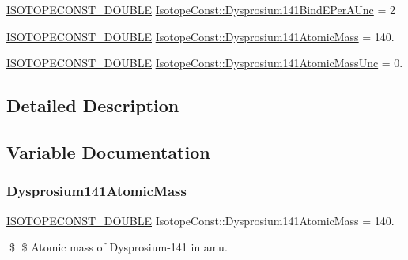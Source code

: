 \begin{DoxyCompactItemize}
\mbox{\hyperlink{group___isotope_const-_macros_ga8f45a7272ce02c0b4c65c44636ed719a}{I\+S\+O\+T\+O\+P\+E\+C\+O\+N\+S\+T\+\_\+\+D\+O\+U\+B\+LE}} \mbox{\hyperlink{group___isotope_const-_dysprosium-_dy141_ga3e916cec9de10a0375128122ea08b862}{Isotope\+Const\+::\+Dysprosium141\+Bind\+E\+Per\+A\+Unc}} = 2
\item 
\mbox{\hyperlink{group___isotope_const-_macros_ga8f45a7272ce02c0b4c65c44636ed719a}{I\+S\+O\+T\+O\+P\+E\+C\+O\+N\+S\+T\+\_\+\+D\+O\+U\+B\+LE}} \mbox{\hyperlink{group___isotope_const-_dysprosium-_dy141_ga73448dca5d056c5194c6903e36caaa44}{Isotope\+Const\+::\+Dysprosium141\+Atomic\+Mass}} = 140.
\item 
\mbox{\hyperlink{group___isotope_const-_macros_ga8f45a7272ce02c0b4c65c44636ed719a}{I\+S\+O\+T\+O\+P\+E\+C\+O\+N\+S\+T\+\_\+\+D\+O\+U\+B\+LE}} \mbox{\hyperlink{group___isotope_const-_dysprosium-_dy141_gade30619dfda139bc3a70a01aa62e1ad4}{Isotope\+Const\+::\+Dysprosium141\+Atomic\+Mass\+Unc}} = 0.
\end{DoxyCompactItemize}


\subsection{Detailed Description}


\subsection{Variable Documentation}
\mbox{\label{group___isotope_const-_dysprosium-_dy141_ga73448dca5d056c5194c6903e36caaa44}} 
\subsubsection{\texorpdfstring{Dysprosium141\+Atomic\+Mass}{Dysprosium141AtomicMass}}
{\footnotesize\ttfamily \mbox{\hyperlink{group___isotope_const-_macros_ga8f45a7272ce02c0b4c65c44636ed719a}{I\+S\+O\+T\+O\+P\+E\+C\+O\+N\+S\+T\+\_\+\+D\+O\+U\+B\+LE}} Isotope\+Const\+::\+Dysprosium141\+Atomic\+Mass = 140.}

\$ \$ Atomic mass of Dysprosium-\/141 in amu. \mbox{\label{group___isotope_const-_dysprosium-_dy141_gade30619dfda139bc3a70a01aa62e1ad4}} 
